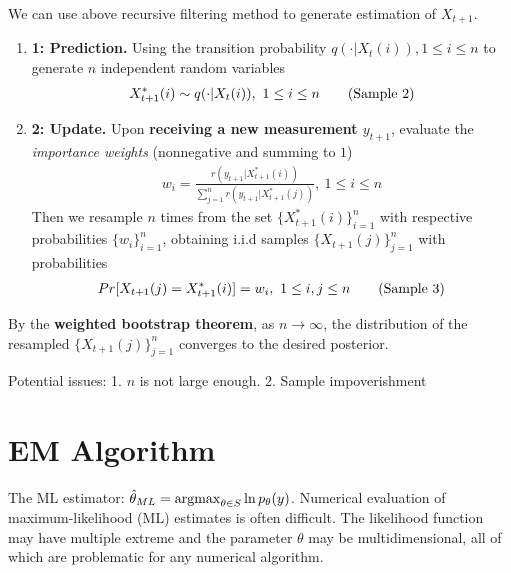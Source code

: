 \documentclass[11pt,a4paper]{article}
\newcommand{\argmax}{\operatornamewithlimits{argmax}}
\begin{document}
We can use above recursive filtering method to generate estimation of $X_{t+1}$.
\begin{enumerate}
    \item \textbf{ 1: Prediction.} Using the transition probability $q(\cdot|X_t(i)),1\leq i\leq n$ to generate $n$ independent random variables
    \begin{equation}
        \begin{aligned}
            X^*_{t+1}(i)\sim q(\cdot|X_t(i)),\ 1\leq i\leq n
        \end{aligned}
        \tag{\text{Sample 2}}
    \end{equation}
    \item \textbf{ 2: Update.} Upon \textbf{receiving a new measurement $y_{t+1}$}, evaluate the \textit{importance weights} (nonnegative and summing to $1$)
    \begin{equation}
        \begin{aligned}
            w_i=\frac{r(y_{t+1}|X_{t+1}^*(i))}{\sum_{j=1}^n r(y_{t+1}|X_{t+1}^*(j))},\ 1\leq i\leq n
        \end{aligned}
        \nonumber
    \end{equation}
    Then we resample $n$ times from the set $\{X_{t+1}^*(i)\}_{i=1}^n$ with respective probabilities $\{w_i\}_{i=1}^n$, obtaining i.i.d samples $\{X_{t+1}(j)\}_{j=1}^n$ with probabilities
    \begin{equation}
        \begin{aligned}
            Pr[X_{t+1}(j)=X_{t+1}^*(i)]=w_i,\ 1\leq i,j\leq n
        \end{aligned}
        \tag{\text{Sample 3}}
    \end{equation}
\end{enumerate}
By the \textbf{weighted bootstrap theorem}, as $n \rightarrow \infty$, the distribution of the
resampled $\{X_{t+1}(j)\}_{j=1}^n$ converges to the desired posterior.


Potential issues: 1. $n$ is not large enough. 2. Sample impoverishment





\section{EM Algorithm}

The ML estimator: $\hat{\theta}_{ML}=\argmax_{\theta\in S}\ln p_\theta(y)$. Numerical evaluation of maximum-likelihood (ML) estimates is often difficult. The likelihood function may have multiple extreme and the parameter $\theta$ may be multidimensional, all of which are problematic for any numerical algorithm.
\end{document}
